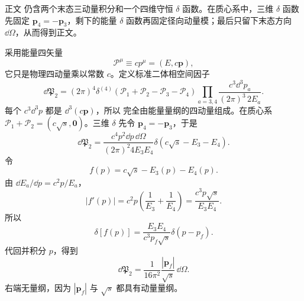 \begin{derivation}[质心系中的二体相空间]
正文 仍含两个末态三动量积分和一个四维守恒 $\delta$ 函数。在质心系中，三维 $\delta$ 函数先固定 $\mathbf p_4=-\mathbf p_3$，剩下的能量 $\delta$ 函数再固定径向动量模；最后只留下末态方向 $\dd\Omega$，从而得到正文。

采用能量四矢量
\begin{equation*}
 \mathcal P^\mu\equiv cp^\mu=(E,c\mathbf p),
 \end{equation*}
它只是物理四动量乘以常数 $c$。定义标准二体相空间因子
\begin{equation*}
 \dd\mathfrak P_2
 =(2\pi)^4\delta^{(4)}(\mathcal P_1+\mathcal P_2-\mathcal P_3-\mathcal P_4)
 \prod_{a=3,4}\frac{c^3\dd^3 p_a}{(2\pi)^3\,2E_a}.
 \end{equation*}
每个 $c^3\dd^3 p$ 都是 $\dd^3(c\mathbf p)$，所以  完全由能量量纲的四动量组成。在质心系 $\mathcal P_1+\mathcal P_2=(c\sqrt s,\mathbf0)$。三维 $\delta$ 先令 $\mathbf p_4=-\mathbf p_3$，于是
\begin{equation*}
 \dd\mathfrak P_2
 =\frac{c^4p^2\dd p\,\dd\Omega}{(2\pi)^2 4E_3E_4}
 \delta(c\sqrt s-E_3-E_4).
\end{equation*}
令
\begin{equation*}
 f(p)=c\sqrt s-E_3(p)-E_4(p).
\end{equation*}
由 $\dd E_a/\dd p=c^2p/E_a$，
\begin{equation*}
 \left|f'(p)\right|
 =c^2p\left(\frac1{E_3}+\frac1{E_4}\right)
 =\frac{c^3p\sqrt s}{E_3E_4}.
\end{equation*}
所以
\begin{equation*}
 \delta[f(p)]
 =\frac{E_3E_4}{c^3p_f\sqrt s}\delta(p-p_f).
\end{equation*}
代回并积分 $p$，得到
\begin{equation*}
 {
 \dd\mathfrak P_2
 =\frac1{16\pi^2}\frac{|\mathbf p_f|}{\sqrt s}\,\dd\Omega.}
 \end{equation*}
右端无量纲，因为 $|\mathbf p_f|$ 与 $\sqrt s$ 都具有动量量纲。
\end{derivation}

